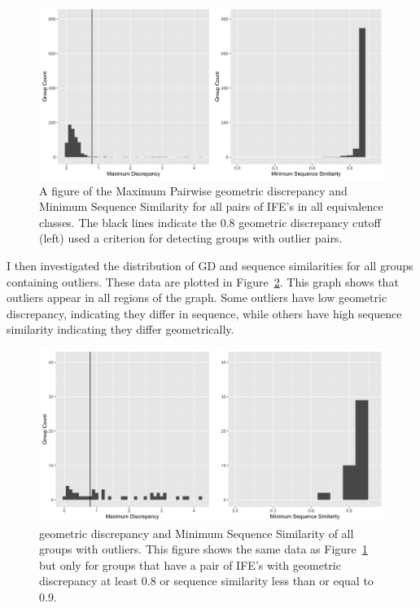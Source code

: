 \begin{figure}[h]
  \includegraphics[width=\textwidth]{chapter-3/figs/eq-summary}
  \caption{A figure of the Maximum Pairwise geometric discrepancy and Minimum Sequence
    Similarity for all pairs of IFE's in all equivalence classes. The black
    lines indicate the 0.8 geometric discrepancy cutoff (left) used a criterion for
  detecting groups with outlier pairs.}
  \label{fig:eq-summary}
\end{figure}

I then investigated the distribution of GD and sequence similarities for all
groups containing outliers. These data are plotted in
Figure~\ref{fig:eq-outlier-summary}. This graph shows that outliers appear in
all regions of the graph. Some outliers have low geometric discrepancy,
indicating they differ in sequence, while others have high sequence similarity
indicating they differ geometrically.

\begin{figure}[h]
  \includegraphics[width=\textwidth]{chapter-3/figs/outlier-summary}
  \caption{geometric discrepancy and Minimum Sequence Similarity of all groups with
  outliers. This figure shows the same data as Figure~\ref{fig:eq-summary} but
only for groups that have a pair of IFE's with geometric discrepancy at least 0.8 or
sequence similarity less than or equal to 0.9.}
  \label{fig:eq-outlier-summary}
\end{figure}

